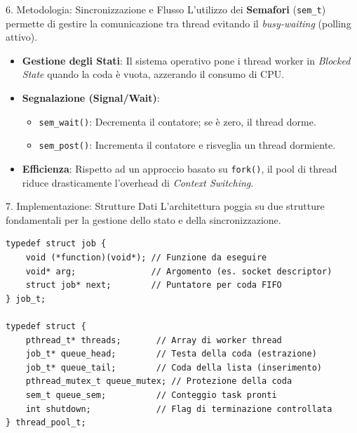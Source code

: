 \documentclass[aspectratio=169, 10pt]{beamer}
\begin{document}
\begin{frame}{6. Metodologia: Sincronizzazione e Flusso}
    L'utilizzo dei \textbf{Semafori} (\texttt{sem\_t}) permette di gestire la comunicazione tra thread evitando il \textit{busy-waiting} (polling attivo).
    
    \begin{itemize}
        \item \textbf{Gestione degli Stati}: Il sistema operativo pone i thread worker in \textit{Blocked State} quando la coda è vuota, azzerando il consumo di CPU.
        \item \textbf{Segnalazione (Signal/Wait)}: 
            \begin{itemize}
                \item \texttt{sem\_wait()}: Decrementa il contatore; se è zero, il thread dorme.
                \item \texttt{sem\_post()}: Incrementa il contatore e risveglia un thread dormiente.
            \end{itemize}
        \item \textbf{Efficienza}: Rispetto ad un approccio basato su \texttt{fork()}, il pool di thread riduce drasticamente l'overhead di \textit{Context Switching}.
    \end{itemize}
\end{frame}

\begin{frame}[fragile]{7. Implementazione: Strutture Dati}
    L'architettura poggia su due strutture fondamentali per la gestione dello stato e della sincronizzazione.
    
\begin{lstlisting}[style=cstyle]
typedef struct job {
    void (*function)(void*); // Funzione da eseguire
    void* arg;               // Argomento (es. socket descriptor)
    struct job* next;        // Puntatore per coda FIFO
} job_t;

typedef struct {
    pthread_t* threads;       // Array di worker thread
    job_t* queue_head;        // Testa della coda (estrazione)
    job_t* queue_tail;        // Coda della lista (inserimento)
    pthread_mutex_t queue_mutex; // Protezione della coda
    sem_t queue_sem;          // Conteggio task pronti
    int shutdown;             // Flag di terminazione controllata
} thread_pool_t;
\end{lstlisting}
\end{frame}
\end{document}
